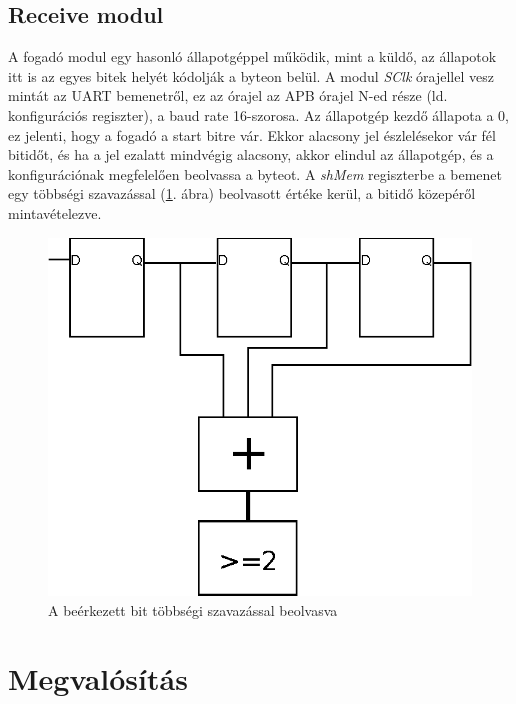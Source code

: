 \subsection{Receive modul}
A fogadó modul egy hasonló állapotgéppel működik, mint a küldő, az állapotok itt is az egyes bitek helyét kódolják a byteon belül. A modul \textit{SClk} órajellel vesz mintát az UART bemenetről, ez az órajel az APB órajel N-ed része (ld. konfigurációs regiszter), a baud rate 16-szorosa. Az állapotgép kezdő állapota a 0, ez jelenti, hogy a fogadó a start bitre vár. Ekkor alacsony jel észlelésekor vár fél bitidőt, és ha a jel ezalatt mindvégig alacsony, akkor elindul az állapotgép, és a konfigurációnak megfelelően beolvassa a byteot. A \textit{shMem} regiszterbe a bemenet egy többségi szavazással (\ref{fig:voter}. ábra) beolvasott értéke kerül, a bitidő közepéről mintavételezve.

\begin{figure}[h]
\vspace{0.5cm}
\begin{center}
\includegraphics{figures/voter.eps}
\caption{A beérkezett bit többségi szavazással beolvasva}
\label{fig:voter}
\end{center}
\vspace{0.5cm}
\end{figure}

\section{Megvalósítás}

